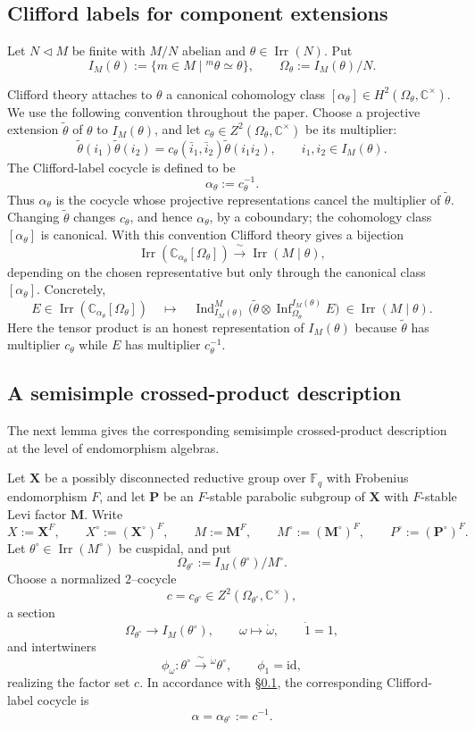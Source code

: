 \documentclass{amsart}
\theoremstyle{plain}
\numberwithin{equation}{section}
\theoremstyle{definition}
\newcommand{\id}{\mathrm{id}}
\newcommand{\Ind}{\operatorname{Ind}}
\newcommand{\Irr}{\operatorname{Irr}}
\newcommand{\infl}{\operatorname{Inf}}
\newcommand{\bP}{\mathbf{P}}
\newcommand{\bM}{\mathbf{M}}
\newcommand{\bX}{\mathbf{X}}
\newcommand{\C}{\mathbb{C}}
\newcommand{\F}{\mathbb{F}}
\begin{document}
  \subsection{Clifford labels for component extensions}\label{subsec:clifford-labels}

Let $N\lhd M$ be finite with $M/N$ abelian and $\theta\in \Irr(N)$. Put
\[
I_M(\theta):=\{m\in M\mid {}^m\theta\simeq \theta\},\qquad \Omega_\theta:=I_M(\theta)/N.
\]

Clifford theory attaches to $\theta$ a canonical cohomology class
$[\alpha_\theta]\in H^2(\Omega_\theta,\C^\times)$.  We use the following
convention throughout the paper.  Choose a projective extension $\tilde\theta$
of $\theta$ to $I_M(\theta)$, and let
$c_\theta\in Z^2(\Omega_\theta,\C^\times)$ be its multiplier:
\[
\tilde\theta(i_1)\tilde\theta(i_2)
=
c_\theta(\bar i_1,\bar i_2)\tilde\theta(i_1i_2),
\qquad i_1,i_2\in I_M(\theta).
\]
The Clifford-label cocycle is defined to be
\[
\alpha_\theta:=c_\theta^{-1}.
\]
Thus $\alpha_\theta$ is the cocycle whose projective representations cancel the
multiplier of $\tilde\theta$.  Changing $\tilde\theta$ changes $c_\theta$, and
hence $\alpha_\theta$, by a coboundary; the cohomology class
$[\alpha_\theta]$ is canonical.  With this convention Clifford theory gives a
bijection
\[
\Irr(\C_{\alpha_\theta}[\Omega_\theta]) \xrightarrow{\ \sim\ } \Irr(M\mid \theta),
\]
depending on the chosen representative but only through the canonical class
$[\alpha_\theta]$.  Concretely,
\[
E\in \Irr(\C_{\alpha_\theta}[\Omega_\theta])
\quad\longmapsto\quad
\Ind_{I_M(\theta)}^{M}
\bigl(\tilde\theta\otimes \infl_{\Omega_\theta}^{I_M(\theta)}E\bigr)
\ \in \Irr(M\mid \theta).
\]
Here the tensor product is an honest representation of $I_M(\theta)$ because
$\tilde\theta$ has multiplier $c_\theta$ while $E$ has multiplier
$c_\theta^{-1}$.
\medskip
\subsection{A semisimple crossed-product description}
\label{subsec:semisimple-crossed-product}

The next lemma gives the corresponding semisimple crossed-product description at the
level of endomorphism algebras.

Let $\bX$ be a possibly disconnected reductive group over $\F_q$ with Frobenius
endomorphism $F$, and let $\bP$ be an $F$-stable parabolic subgroup of $\bX$ with
$F$-stable Levi factor $\bM$. Write
\[
X:=\bX^F,\qquad X^\circ:=(\bX^\circ)^F,\qquad
M:=\bM^F,\qquad M^\circ:=(\bM^\circ)^F,\qquad P^\circ:=(\bP^\circ)^F.
\]
Let $\theta^\circ\in \Irr(M^\circ)$ be cuspidal, and put
\[
\Omega_{\theta^\circ}:=I_M(\theta^\circ)/M^\circ.
\]
Choose a normalized $2$--cocycle
\[
c=c_{\theta^\circ}\in Z^2(\Omega_{\theta^\circ},\C^\times),
\]
a section
\[
\Omega_{\theta^\circ}\longrightarrow I_M(\theta^\circ),\qquad
\omega\longmapsto \dot\omega,\qquad \dot 1=1,
\]
and intertwiners
\[
\phi_\omega:\theta^\circ\xrightarrow{\ \sim\ }{}^{\dot\omega}\theta^\circ,
\qquad \phi_1=\id,
\]
realizing the factor set $c$.  In accordance with
\S\ref{subsec:clifford-labels}, the corresponding Clifford-label cocycle is
\[
\alpha=\alpha_{\theta^\circ}:=c^{-1}.
\]
\end{document}
